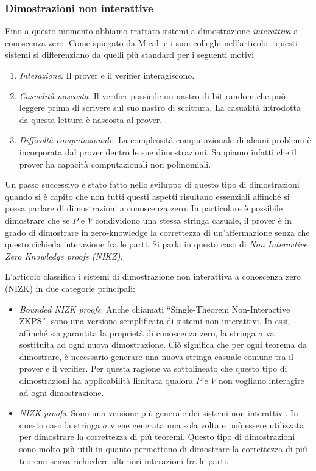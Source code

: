 \documentclass{article}
\theoremstyle{definition}
\begin{document}
\subsubsection{Dimostrazioni non interattive}
Fino a questo momento abbiamo trattato sistemi a dimostrazione \emph{interattiva} a conoscenza zero.
Come spiegato da Micali e i suoi colleghi nell'articolo \cite{noninteractive}, questi sistemi si differenziano da quelli più standard per i seguenti motivi 
\begin{enumerate}
    \item \emph{Interazione}. Il prover e il verifier interagiscono.
    \item \emph{Casualità nascosta}. Il verifier possiede un nastro di bit random che può leggere prima di scrivere sul suo nastro di scrittura. La casualità introdotta da questa lettura è nascosta al prover.
    \item \emph{Difficoltà computazionale}. La complessità computazionale di alcuni problemi è incorporata dal prover dentro le sue dimostrazioni. Sappiamo infatti che il prover ha capacità computazionali non polinomiali.
\end{enumerate}
Un passo successivo è stato fatto nello sviluppo di questo tipo di dimostrazioni quando si è capito che non tutti questi aspetti risultano essenziali affinché si possa parlare di dimostrazioni a conoscenza zero.
In particolare è possibile dimostrare che se $P$ e $V$ condividono una stessa stringa casuale, il prover è in grado di dimostrare in zero-knowledge la correttezza di un'affermazione senza che questo richieda interazione fra le parti. Si parla in questo caso di \emph{Non Interactive Zero Knowledge proofs (NIKZ)}. 

L'articolo \cite{noninteractive} classifica i sistemi di dimostrazione non interattiva a conoscenza zero (NIZK) in due categorie principali: 
\begin{itemize}
    \item \emph{Bounded NIZK proofs}. Anche chiamati ``Single-Theorem Non-Interactive ZKPS'', sono una versione semplificata di sistemi non interattivi. In essi, affinché sia garantita la proprietà di conoscenza zero, la stringa $\sigma$ va sostituita ad ogni nuova dimostrazione. 
    Ciò significa che per ogni teorema da dimostrare, è necessario generare una nuova stringa casuale comune tra il prover e il verifier.
    Per questa ragione va sottolineato che questo tipo di dimostrazioni ha applicabilità limitata qualora $P$ e $V$ non vogliano interagire ad ogni dimostrazione.
    \item \emph{NIZK proofs}. Sono una versione più generale dei sistemi non interattivi. In questo caso la stringa $\sigma$ viene generata una sola volta e può essere utilizzata per dimostrare la correttezza di più teoremi. Questo tipo di dimostrazioni sono molto più utili in quanto permettono di dimostrare la correttezza di più teoremi senza richiedere ulteriori interazioni fra le parti.
\end{itemize} 
\end{document}
